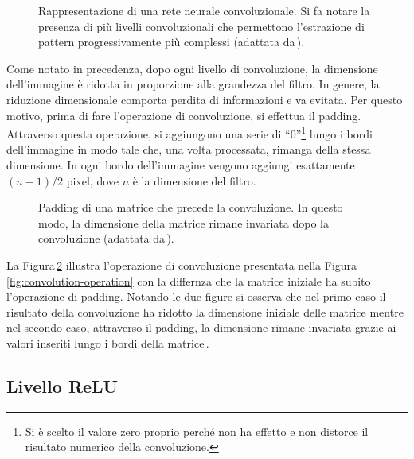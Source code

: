 % 
\begin{figure}[!t]
    \centering
    
    \caption[Rappresentazione di una rete neurale convoluzionale.]{Rappresentazione di una rete neurale convoluzionale. Si fa notare la presenza di più livelli convoluzionali che permettono l'estrazione di pattern progressivamente più complessi (adattata da\,\cite{izaak2022neural}).}\label{fig:convolutional-neural-network}
\end{figure}

Come notato in precedenza, dopo ogni livello di convoluzione, la dimensione dell'immagine è ridotta in proporzione alla grandezza del filtro. In genere, la riduzione dimensionale comporta perdita di informazioni e va evitata. Per questo motivo, prima di fare l'operazione di convoluzione, si effettua il padding. Attraverso questa operazione, si aggiungono una serie di ``0''\footnote{Si è scelto il valore zero proprio perché non ha effetto e non distorce il risultato numerico della convoluzione.} lungo i bordi dell'immagine in modo tale che, una volta processata, rimanga della stessa dimensione. In ogni bordo dell'immagine vengono aggiungi esattamente $(n - 1) / 2$ pixel, dove $n$ è la dimensione del filtro. 
% 
\begin{figure}[!t]
    \centering
    
    \caption[Padding di una matrice che precede la convoluzione.]{Padding di una matrice che precede la convoluzione. In questo modo, la dimensione della matrice rimane invariata dopo la convoluzione (adattata da\,\cite{janosh_convolution}).}\label{fig:padding}
\end{figure}
% 
La Figura\,\ref{fig:padding} illustra l'operazione di convoluzione presentata nella Figura\,\ref{fig:convolution-operation} con la differnza che la matrice iniziale ha subito l'operazione di padding. Notando le due figure si osserva che nel primo caso il risultato della convoluzione ha ridotto la dimensione iniziale delle matrice mentre nel secondo caso, attraverso il padding, la dimensione rimane invariata grazie ai valori inseriti lungo i bordi della matrice\,\cite{aggarwal2018neural}.

\subsection{Livello \acs{ReLU}}

